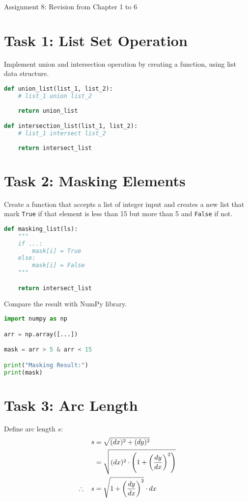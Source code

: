 \documentclass[11pt]{article}
\begin{document}
\begin{center}
    \Large{Assignment 8: Revision from Chapter 1 to 6}
\end{center}

\section*{Task 1: List Set Operation}
Implement union and intersection operation by creating a function, using list data structure.

\begin{lstlisting}[language=Python]
def union_list(list_1, list_2):
    # list_1 union list_2
    
    return union_list

def intersection_list(list_1, list_2):
    # list_1 intersect list_2
    
    return intersect_list
\end{lstlisting}


\section*{Task 2: Masking Elements}
Create a function that accepts a list of integer input and creates a new list that mark \texttt{True} if that element is less than 15 but more than 5 and \texttt{False} if not.

\begin{lstlisting}[language=Python]
def masking_list(ls):
    """
    if ...:
        mask[i] = True
    else:
        mask[i] = False
    """

    return intersect_list
\end{lstlisting}

Compare the result with NumPy library.

\begin{lstlisting}[language=Python]
import numpy as np

arr = np.array([...])

mask = arr > 5 & arr < 15

print("Masking Result:")
print(mask)
\end{lstlisting}

\section*{Task 3: Arc Length}
Define arc length \(s\):
\[
\begin{aligned}
    s &= \sqrt{(dx)^2 + (dy)^2}\\
    &= \sqrt{(dx)^2 \cdot \left(1 + \left(\frac{dy}{dx} \right)^2 \right)}\\
    \therefore \hspace{0.3cm} s &= \sqrt{1 + \left(\frac{dy}{dx} \right)^2} \cdot dx
\end{aligned}
\]
\end{document}
